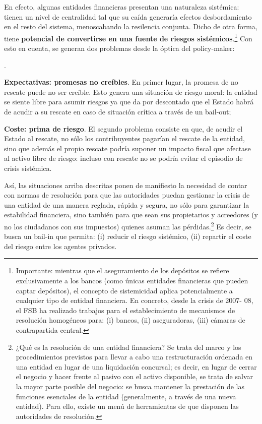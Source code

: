 \documentclass[10pt,a4paper]{article}
\newcounter{numitem}
\newenvironment{lnum}
      {\begin{list}{\arabic{numitem}.}{%
          \usecounter{numitem}%
          \setlength{\leftmargin}{1cm}%
          \setlength{\parskip}{3pt}%
          \setlength{\itemsep}{0pt}%
          \setlength{\parsep}{0pt}%
      }}
      {\end{list}}
\begin{document}
En efecto, algunas entidades financieras presentan una naturaleza sistémica: tienen un nivel de centralidad tal que su caída generaría efectos desbordamiento en el resto del sistema, menoscabando la resilencia conjunta. Dicho de otra forma, tiene \textbf{potencial de convertirse en una fuente de riesgos sistémicos}.\footnote{%
    Importante: mientras que el aseguramiento de los depósitos se refiere exclusivamente a los bancos (como únicas entidades financieras que pueden captar depósitos), el concepto de sistemicidad aplica potencialmente a cualquier tipo de entidad financiera. En concreto, desde la crisis de 2007- 08, el FSB ha realizado trabajos para el establecimiento de mecanismos de resolución homogéneos para: (i) bancos, (ii) aseguradoras, (iii) cámaras de contrapartida central.
} Con esto en cuenta, se generan dos problemas desde la óptica del policy-maker:
\begin{lnum}
    \item \textbf{Expectativas: promesas no creíbles}. En primer lugar, la promesa de no rescate puede no ser creíble. Esto genera una situación de riesgo moral: la entidad se siente libre para asumir riesgos ya que da por descontado que el Estado habrá de acudir a su rescate en caso de situación crítica a través de un bail-out;
    \item \textbf{Coste: prima de riesgo}. El segundo problema consiste en que, de acudir el Estado al rescate, no sólo los contribuyentes pagarían el rescate de la entidad, sino que además el propio rescate podría suponer un impacto fiscal que afectase al activo libre de riesgo: incluso con rescate no se podría evitar el episodio de crisis sistémica. 
\end{lnum}

Así, las situaciones arriba descritas ponen de manifiesto la necesidad de contar con normas de resolución para que las autoridades puedan gestionar la crisis de una entidad de una manera reglada, rápida y segura, no sólo para garantizar la estabilidad financiera, sino también para que sean sus propietarios y acreedores (y no los ciudadanos con sus impuestos) quienes asuman las pérdidas.\footnote{%
    ¿Qué es la resolución de una entidad financiera? Se trata del marco y los procedimientos previstos para llevar a cabo una restructuración ordenada en una entidad en lugar de una liquidación concursal; es decir, en lugar de cerrar el negocio y hacer frente al pasivo con el activo disponible, se trata de salvar la mayor parte posible del negocio: se busca mantener la prestación de las funciones esenciales de la entidad (generalmente, a través de una nueva entidad). Para ello, existe un menú de herramientas de que disponen las autoridades de resolución.
} Es decir, se busca un bail-in que permita: (i) reducir el riesgo sistémico, (ii) repartir el coste del riesgo entre los agentes privados. 
\end{document}
